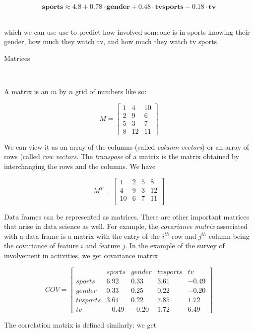 \documentclass{article}
\begin{document}
\[  \textbf{sports} \approx 4.8 +0.78 \cdot\textbf{gender} + 0.48 \cdot \textbf{tvsports} - 0.18 \cdot \textbf{tv} \]\

\noindent which we can use use to predict how involved someone is in sports knowing their gender, how much they watch tv, and how much they watch tv sports.\\

\centerline{\sc \large Matrices}\

A matrix is an $m$ by $n$ grid of numbers like so: 

\[ M = \left[ \begin{array}{ccc}
1 & 4 & 10 \\
2 & 9 & 6 \\
5 & 3 & 7  \\
8 & 12 & 11 \end{array} \right]\] 

We can view it as an array of the columns (called \emph{column vectors}) or an array of rows (called \emph{row vectors}. The \emph{transpose} of a matrix is the matrix obtained by interchanging the rows and the columns. We have

\[ M^T = \left[ \begin{array}{cccc}
1 & 2 & 5 & 8 \\
4 & 9 & 3 & 12 \\
10 & 6 & 7 & 11\\
 \end{array} \right]\] 

Data frames can be represented as matrices. There are other important matrices that arise in data science as well. For example, the \emph{covariance matrix} associated with a data frame is a matrix with the entry of the $i^{th}$ row and $j^{th}$ column being the covariance of feature $i$ and feature $j$. In the example of the survey of involvement in activities, we get covariance matrix


\[ COV = \left[ \begin{array}{ccccc}
 & sports & gender & tv sports & tv \\
sports & 6.92 & 0.33 & 3.61 & -0.49 \\
gender & 0.33 & 0.25 & 0.22 & -0.20  \\
tv sports  & 3.61 & 0.22 & 7.85 & 1.72 \\
tv  & -0.49 & -0.20 & 1.72 & 6.49 
\end{array} \right]\] 

The correlation matrix is defined similarly: we get
\end{document}
